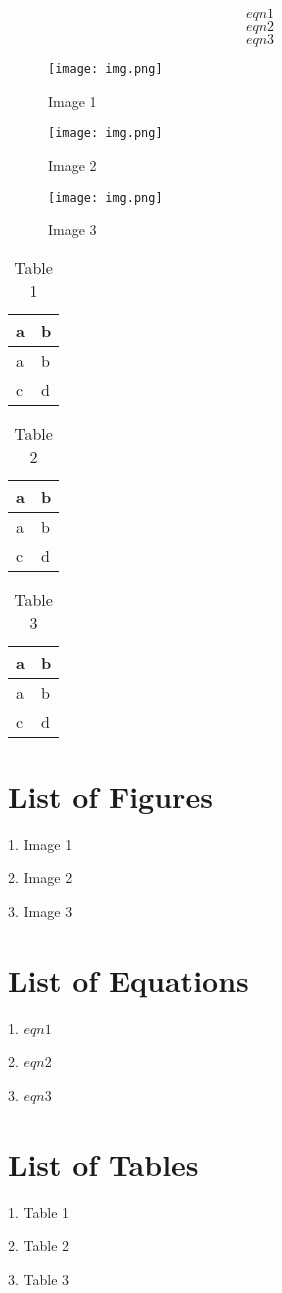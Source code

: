 \begin{equation}eqn1\label{eq:1}\end{equation}
\begin{equation}eqn2\label{eq:2}\end{equation}
\begin{equation}eqn3\label{eq:3}\end{equation}

\begin{figure}
\hypertarget{fig:1}{%
\centering
\texttt{[image: img.png]}
\caption{Image 1}\label{fig:1}
}
\end{figure}

\begin{figure}
\hypertarget{fig:2}{%
\centering
\texttt{[image: img.png]}
\caption{Image 2}\label{fig:2}
}
\end{figure}

\begin{figure}
\hypertarget{fig:3}{%
\centering
\texttt{[image: img.png]}
\caption{Image 3}\label{fig:3}
}
\end{figure}

\hypertarget{tbl:1}{}
\begin{longtable}[]{@{}ll@{}}
\caption{\label{tbl:1}Table 1}\tabularnewline
\toprule
a & b\tabularnewline
\midrule
\endfirsthead
\toprule
a & b\tabularnewline
\midrule
\endhead
c & d\tabularnewline
\bottomrule
\end{longtable}

\hypertarget{tbl:2}{}
\begin{longtable}[]{@{}ll@{}}
\caption{\label{tbl:2}Table 2}\tabularnewline
\toprule
a & b\tabularnewline
\midrule
\endfirsthead
\toprule
a & b\tabularnewline
\midrule
\endhead
c & d\tabularnewline
\bottomrule
\end{longtable}

\hypertarget{tbl:3}{}
\begin{longtable}[]{@{}ll@{}}
\caption{\label{tbl:3}Table 3}\tabularnewline
\toprule
a & b\tabularnewline
\midrule
\endfirsthead
\toprule
a & b\tabularnewline
\midrule
\endhead
c & d\tabularnewline
\bottomrule
\end{longtable}

\section{List of Figures}

1. Image 1

2. Image 2

3. Image 3

\section{List of Equations}

1. \(eqn1\)

2. \(eqn2\)

3. \(eqn3\)

\section{List of Tables}

1. Table 1

2. Table 2

3. Table 3

\listoffigures

\listoftables
